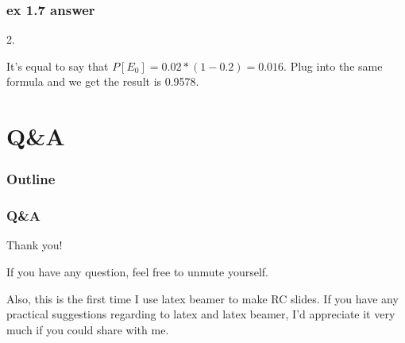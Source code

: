 \documentclass{beamer}
\begin{document}
\begin{frame}
    \frametitle{ex 1.7 answer}
    2. \par
    It's equal to say that $P[E_0]=0.02*(1-0.2)=0.016$. Plug into the same formula and we get the result is 0.9578.
    
\end{frame}

\section{Q\&A}
\begin{frame}
    \frametitle{Outline}
    \tableofcontents[currentsection]
\end{frame}
\begin{frame}
    \frametitle{Q\&A}
    Thank you!\par
    \vspace{0.3cm}
    If you have any question, feel free to unmute yourself. \par
    \vspace{0.3cm}
    Also, this is the first time I use latex beamer to make RC slides. If you have any practical suggestions regarding to latex and latex beamer, I'd appreciate it very much if you could share with me.

    

\end{frame}
\end{document}
